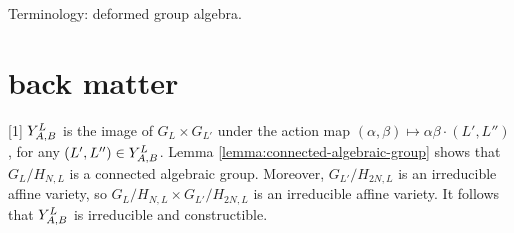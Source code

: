 \documentclass[a4paper, 11pt]{report}
\begin{document}
Terminology: deformed group algebra.

\section{back matter}

[1] $\yprod[L]{A,B}$ is the image of $G_L\times G_{L'}$ under the action map $(\alpha,\beta)\mapsto \alpha\beta\cdot(L',L'')$, for any $(L',L'')\in\yprod[L]{A,B}$. Lemma \ref{lemma:connected-algebraic-group} shows that $G_L/{H_{N,L}}$ is a connected algebraic group. Moreover, $G_{L'}/{H_{2N,L}}$ is an irreducible affine variety, so $G_{L}/{H_{N,L}}\times G_{L'}/{H_{2N,L}}$ is an irreducible affine variety. It follows that $\yprod[L]{A,B}$ is irreducible and constructible.


\nocite{*}
\printbibliography
\end{document}
